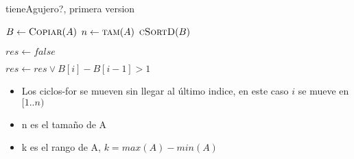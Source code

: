 \documentclass[pdf
]{beamer}
\begin{document}
\begin{frame}{tieneAgujero?, primera version}


\begin{algorithm}[H]

\caption{tieneAgujero?}
\begin{algorithmic}[1]

  \State $B \gets \Call{Copiar}{A}$	
	\State $n \gets \Call{tam}{A}$
  \State $\Call{cSortD}{B}$			\uncover<2->{\Comment $O(n+k)$}

  \State $res \gets false$		\uncover<2->{\Comment $O(1)$}

  	
  \State $res \gets res \lor B[i]-B[i-1]> 1$	\uncover<2->{\Comment $O(1)$}
  \EndFor	




\EndProcedure
\end{algorithmic}
\end{algorithm}





\begin{itemize}
\item Los ciclos-for se mueven sin llegar al último indice, en este caso $i$ se mueve en $[1..n)$
\item <2-> n es el tamaño de A
\item <2-> k es el rango de A, $k=max(A)-min(A)$

\end{itemize}




\end{frame}
\end{document}
